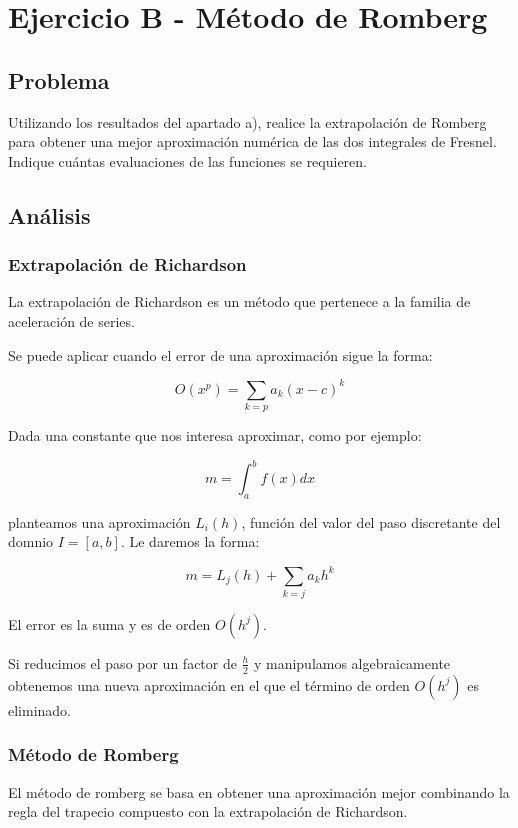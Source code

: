 \section{Ejercicio B - Método de Romberg}


\subsection{Problema}

Utilizando los resultados del apartado a), realice la extrapolación de Romberg para obtener una mejor aproximación numérica de las dos integrales de Fresnel. Indique cuántas evaluaciones de las funciones se requieren.


\subsection{Análisis}


\subsubsection{Extrapolación de Richardson}

La extrapolación de Richardson es un método que pertenece a la familia de aceleración de series.

Se puede aplicar cuando el error de una aproximación sigue la forma: 

$$
O(x^p) = \sum_{k=p} a_k (x - c)^k
$$

Dada una constante que nos interesa aproximar, como por ejemplo:

$$
m = \int_{a}^{b}  f(x) dx
$$

planteamos una aproximación $L_i(h)$, función del valor del paso discretante del domnio $I = [a, b]$. Le daremos la forma: 

$$
m = L_j(h) + \sum_{k = j}a_k h^k
$$

El error es la suma y es de orden $O(h^j)$.

Si reducimos el paso por un factor de $\frac{h}{2}$ y manipulamos algebraicamente obtenemos una nueva aproximación en el que el término de orden $O(h^j)$ es eliminado.


\subsubsection{Método de Romberg}

El método de romberg se basa en obtener una aproximación mejor combinando la regla del trapecio compuesto con la extrapolación de Richardson.

